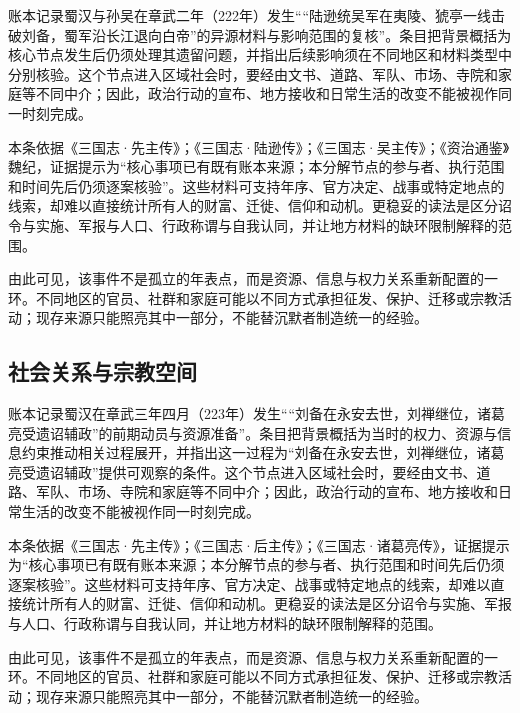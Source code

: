 账本记录蜀汉与孙吴在章武二年（222年）发生““陆逊统吴军在夷陵、猇亭一线击破刘备，蜀军沿长江退向白帝”的异源材料与影响范围的复核”。条目把背景概括为核心节点发生后仍须处理其遗留问题，并指出后续影响须在不同地区和材料类型中分别核验。这个节点进入区域社会时，要经由文书、道路、军队、市场、寺院和家庭等不同中介；因此，政治行动的宣布、地方接收和日常生活的改变不能被视作同一时刻完成。

本条依据《三国志·先主传》；《三国志·陆逊传》；《三国志·吴主传》；《资治通鉴》魏纪，证据提示为“核心事项已有既有账本来源；本分解节点的参与者、执行范围和时间先后仍须逐案核验”。这些材料可支持年序、官方决定、战事或特定地点的线索，却难以直接统计所有人的财富、迁徙、信仰和动机。更稳妥的读法是区分诏令与实施、军报与人口、行政称谓与自我认同，并让地方材料的缺环限制解释的范围。

由此可见，该事件不是孤立的年表点，而是资源、信息与权力关系重新配置的一环。不同地区的官员、社群和家庭可能以不同方式承担征发、保护、迁移或宗教活动；现存来源只能照亮其中一部分，不能替沉默者制造统一的经验。

\subsection{社会关系与宗教空间}

账本记录蜀汉在章武三年四月（223年）发生““刘备在永安去世，刘禅继位，诸葛亮受遗诏辅政”的前期动员与资源准备”。条目把背景概括为当时的权力、资源与信息约束推动相关过程展开，并指出这一过程为“刘备在永安去世，刘禅继位，诸葛亮受遗诏辅政”提供可观察的条件。这个节点进入区域社会时，要经由文书、道路、军队、市场、寺院和家庭等不同中介；因此，政治行动的宣布、地方接收和日常生活的改变不能被视作同一时刻完成。

本条依据《三国志·先主传》；《三国志·后主传》；《三国志·诸葛亮传》，证据提示为“核心事项已有既有账本来源；本分解节点的参与者、执行范围和时间先后仍须逐案核验”。这些材料可支持年序、官方决定、战事或特定地点的线索，却难以直接统计所有人的财富、迁徙、信仰和动机。更稳妥的读法是区分诏令与实施、军报与人口、行政称谓与自我认同，并让地方材料的缺环限制解释的范围。

由此可见，该事件不是孤立的年表点，而是资源、信息与权力关系重新配置的一环。不同地区的官员、社群和家庭可能以不同方式承担征发、保护、迁移或宗教活动；现存来源只能照亮其中一部分，不能替沉默者制造统一的经验。

